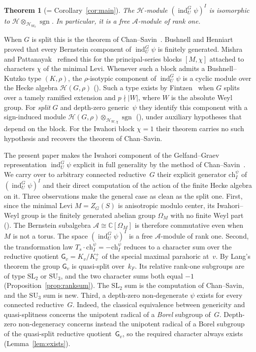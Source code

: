 \documentclass[11pt]{amsart}
\newtheorem*{theoremstar}{Theorem}
\theoremstyle{definition}
\theoremstyle{remark}
\DeclareMathOperator{\ind}{ind}
\DeclareMathOperator{\sgn}{sgn}
\newcommand{\CC}{\mathbb{C}}
\newcommand{\HH}{\mathcal{H}}
\newcommand{\AAA}{\mathcal{A}}
\begin{document}
\begin{theoremstar}[{= Corollary~\ref{cor:main}}]
The $\HH$-module $(\ind_U^G \psi)^I$ is isomorphic to $\HH \otimes_{\HH_{W_0}} \sgn$. In particular, it is a free $\AAA$-module of rank one.
\end{theoremstar}

When $G$ is split this is the theorem of Chan--Savin~\cite{CS}. Bushnell and Henniart~\cite{BH} proved that every Bernstein component of $\ind_U^G\psi$ is finitely generated. Mishra and Pattanayak~\cite{MP} refined this for the principal-series blocks $[M,\chi]$ attached to characters $\chi$ of the minimal Levi. Whenever such a block admits a Bushnell--Kutzko type $(K,\rho)$, the $\rho$-isotypic component of $\ind_U^G\psi$ is a cyclic module over the Hecke algebra $\HH(G,\rho)$ (\cite[Theorem~1]{MP}). Such a type exists by Fintzen~\cite{Fintzen} when $G$ splits over a tamely ramified extension and $p \nmid |W|$, where $W$ is the absolute Weyl group. For \emph{split} $G$ and depth-zero generic~$\psi$ they identify this component with a sign-induced module $\HH(G,\rho)\otimes_{\HH_{W,\chi}}\sgn$ (\cite[Theorem~3]{MP}), under auxiliary hypotheses that depend on the block. For the Iwahori block $\chi = 1$ their theorem carries no such hypothesis and recovers the theorem of Chan--Savin.

The present paper makes the Iwahori component of the Gelfand--Graev representation $\ind_U^G\psi$ explicit in full generality by the method of Chan--Savin~\cite{CS}. We carry over to arbitrary connected reductive~$G$ their explicit generator $\mathrm{ch}_I^\psi$ of $(\ind_U^G\psi)^I$ and their direct computation of the action of the finite Hecke algebra on it. Three observations make the general case as clean as the split one. First, since the minimal Levi $M = Z_G(S)$ is anisotropic modulo center, its Iwahori--Weyl group is the finitely generated abelian group $\Omega_M$ with no finite Weyl part (\cite[\S 2.9]{Rostami}). The Bernstein subalgebra $\AAA \cong \CC[\Omega_M]$ is therefore commutative even when $M$ is not a torus. The space $(\ind_U^G\psi)^I$ is a free $\AAA$-module of rank one. Second, the transformation law $T_s \cdot \mathrm{ch}_I^\psi = -\mathrm{ch}_I^\psi$ reduces to a character sum over the reductive quotient $\mathsf{G}_v = K_v/K_v^+$ of the special maximal parahoric at~$v$. By Lang's theorem the group $\mathsf{G}_v$ is quasi-split over~$k_F$. Its relative rank-one subgroups are of type $\mathrm{SL}_2$ or $\mathrm{SU}_3$, and the two character sums both equal $-1$ (Proposition~\ref{prop:ranksum}). The $\mathrm{SL}_2$ sum is the computation of Chan--Savin, and the $\mathrm{SU}_3$ sum is new. Third, a depth-zero non-degenerate $\psi$ exists for every connected reductive~$G$. Indeed, the classical equivalence between genericity and quasi-splitness concerns the unipotent radical of a \emph{Borel} subgroup of~$G$. Depth-zero non-degeneracy concerns instead the unipotent radical of a Borel subgroup of the quasi-split reductive quotient~$\mathsf{G}_v$, so the required character always exists (Lemma~\ref{lem:exists}).
\end{document}
